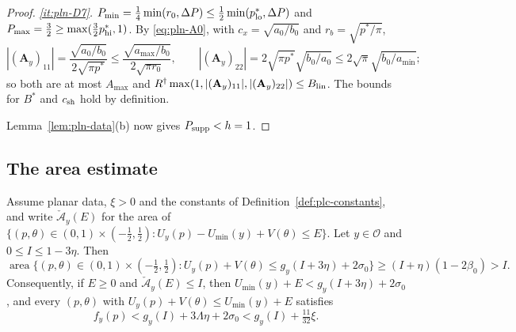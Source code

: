 \begin{proof}
\emph{\ref{it:pln-D7}.} $P_{\min}=\frac14\min(r_0,\Delta P)\le\frac12\min(p^*_{\rm lo},\Delta P)$ and
$P_{\max}=\frac32\ge\max(\frac32p^*_{\rm hi},1)$. By \eqref{eq:pln-A0}, with $c_x=\sqrt{a_0/b_0}$ and
$r_b=\sqrt{p^*/\pi}$,
\[
 |(\mathbf A_y)_{11}|=\frac{\sqrt{a_0/b_0}}{2\sqrt{\pi p^*}}\le\frac{\sqrt{a_{\max}/b_0}}{2\sqrt{\pi r_0}},\qquad
 |(\mathbf A_y)_{22}|=2\sqrt{\pi p^*}\sqrt{b_0/a_0}\le2\sqrt\pi\sqrt{b_0/a_{\min}};
\]
so both are at most $A_{\max}$ and
$R^\dagger\max(1,|(\mathbf A_y)_{11}|,|(\mathbf A_y)_{22}|)\le B_{\rm lin}$. The bounds for $B^*$ and $c_{\rm sh}$ hold by
definition.

Lemma~\ref{lem:pln-data}(b) now gives $P_{\rm supp}<h=1$.
\end{proof}

\subsection{The area estimate}\label{sec:plc-area}

\begin{lemma}\label{lem:plc-area}
Assume planar data, $\xi>0$ and the constants of Definition~\ref{def:plc-constants}, and write $\check{\mathcal A}_y(E)$
for the area of $\{(p,\theta)\in(0,1)\times(-\frac12,\frac12):U_y(p)-U_{\min}(y)+V(\theta)\le E\}$. Let $y\in\mathcal O$ and
$0\le I\le1-3\eta$. Then
\begin{equation}\label{eq:plc-area}
 \operatorname{area}\bigl\{(p,\theta)\in(0,1)\times(-\tfrac12,\tfrac12):U_y(p)+V(\theta)\le g_y(I+3\eta)+2\sigma_0\bigr\}
 \ge(I+\eta)(1-2\beta_0)>I.
\end{equation}
Consequently, if $E\ge0$ and $\check{\mathcal A}_y(E)\le I$, then $U_{\min}(y)+E<g_y(I+3\eta)+2\sigma_0$, and every $(p,\theta)$ with
$U_y(p)+V(\theta)\le U_{\min}(y)+E$ satisfies
\begin{equation}\label{eq:plc-core-value}
 f_y(p)<g_y(I)+3\Lambda\eta+2\sigma_0<g_y(I)+\tfrac{11}{32}\xi .
\end{equation}
\end{lemma}

